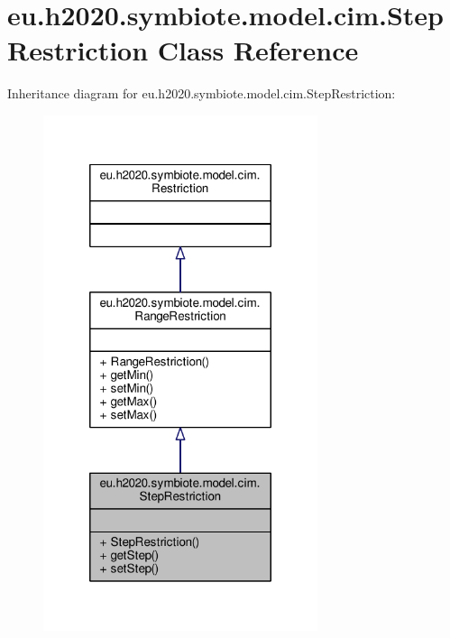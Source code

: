 \hypertarget{classeu_1_1h2020_1_1symbiote_1_1model_1_1cim_1_1StepRestriction}{}\section{eu.\+h2020.\+symbiote.\+model.\+cim.\+Step\+Restriction Class Reference}
\label{classeu_1_1h2020_1_1symbiote_1_1model_1_1cim_1_1StepRestriction}


Inheritance diagram for eu.\+h2020.\+symbiote.\+model.\+cim.\+Step\+Restriction\+:\nopagebreak
\begin{figure}[H]
\begin{center}
\leavevmode
\includegraphics[width=228pt]{classeu_1_1h2020_1_1symbiote_1_1model_1_1cim_1_1StepRestriction__inherit__graph}
\end{center}
\end{figure}


